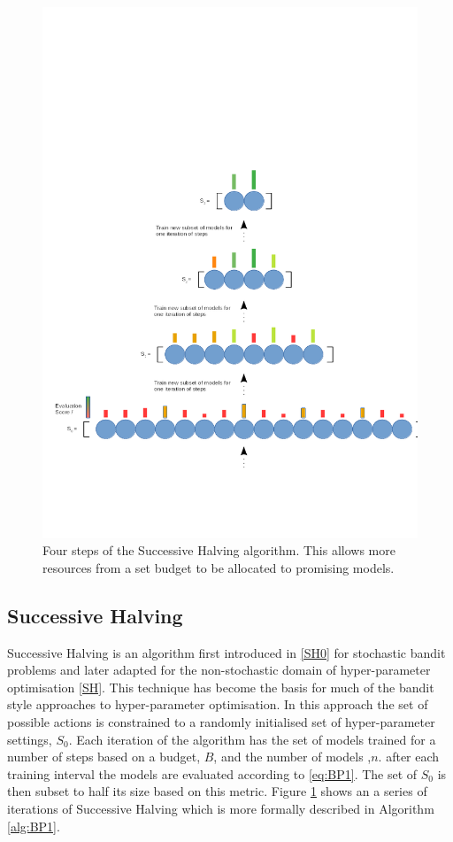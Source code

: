 \documentclass{article}
\begin{document}
			\begin{figure}[h]
			
			\centering 
			\includegraphics[trim= 100 100 100 300 ,scale=0.35]{bandit.png}


			\caption{Four steps of the Successive Halving algorithm. This allows more resources from a set budget to be allocated to promising models. }
			\label{fig:BP1}


			\end{figure}



	\subsection{Successive Halving}

	Successive Halving is an algorithm first introduced in \ref{SH0} for stochastic bandit problems and later adapted for the non-stochastic domain of hyper-parameter optimisation \ref{SH}. This technique has become the basis for much of the bandit style approaches to hyper-parameter optimisation. In this approach the set of possible actions is constrained to a randomly initialised set of hyper-parameter settings, \(S_0\).
	Each iteration of the algorithm has the set of models trained for a number of steps based on a budget, \(B\), and the number of models ,\(n\). after each training interval the models are evaluated according to \ref{eq:BP1}. The set of \(S_0\) is then subset to half its size based on this metric. Figure \ref{fig:BP1} shows an a series of iterations of Successive Halving which is more formally described in Algorithm \ref{alg:BP1}.
\end{document}
